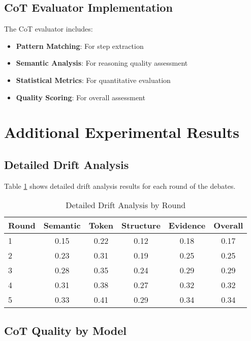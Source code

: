 \documentclass[11pt]{article}
\begin{document}
\subsection{CoT Evaluator Implementation}

The CoT evaluator includes:

\begin{itemize}
    \item \textbf{Pattern Matching}: For step extraction
    \item \textbf{Semantic Analysis}: For reasoning quality assessment
    \item \textbf{Statistical Metrics}: For quantitative evaluation
    \item \textbf{Quality Scoring}: For overall assessment
\end{itemize}

\section{Additional Experimental Results}

\subsection{Detailed Drift Analysis}

Table \ref{tab:detailed_drift} shows detailed drift analysis results for each round of the debates.

\begin{table}[h]
\centering
\caption{Detailed Drift Analysis by Round}
\label{tab:detailed_drift}
\begin{tabular}{lccccc}
\toprule
Round & Semantic & Token & Structure & Evidence & Overall \\
\midrule
1 & 0.15 & 0.22 & 0.12 & 0.18 & 0.17 \\
2 & 0.23 & 0.31 & 0.19 & 0.25 & 0.25 \\
3 & 0.28 & 0.35 & 0.24 & 0.29 & 0.29 \\
4 & 0.31 & 0.38 & 0.27 & 0.32 & 0.32 \\
5 & 0.33 & 0.41 & 0.29 & 0.34 & 0.34 \\
\bottomrule
\end{tabular}
\end{table}

\subsection{CoT Quality by Model}
\end{document}
